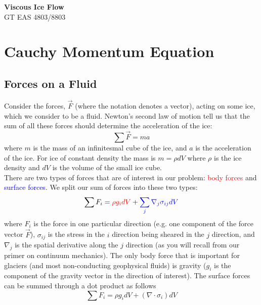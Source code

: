 \documentclass[12pt]{article}
\theoremstyle{definition}
\begin{document}
\thispagestyle{empty}

\begin{center}
{\LARGE \bf Viscous Ice Flow}\\
{\large GT EAS 4803/8803}\\
\end{center}
\section{Cauchy Momentum Equation}

\subsection{Forces on a Fluid}

Consider the forces, $\vec{F}$ (where the notation denotes a vector), acting on some ice, which we consider to be a fluid. Newton's second law of motion tell us that the sum of all these forces should determine the acceleration of the ice:
\begin{equation}
\sum \vec{F} = ma
\end{equation}
where $m$ is the mass of an infinitesmal cube of the ice, and $a$ is the acceleration of the ice. For ice of constant density the mass is $m=\rho dV$ where $\rho$ is the ice density and $dV$ is the volume of the small ice cube. \\

There are two types of forces that are of interest in our problem: \textcolor{red}{body forces} and \textcolor{blue}{surface forces}. We split our sum of forces into these two types:
\begin{equation}
\sum F_i = \textcolor{red}{\rho g_i dV} + \textcolor{blue}{\sum_j \nabla_j \sigma_{ij} dV}
\end{equation}
where $F_i$ is the force in one particular direction (e.g. one component of the force vector $\vec{F}$), $\sigma_{ij}$ is the stress in the $i$ direction being sheared in the $j$ direction, and $\nabla_j$ is the spatial derivative along the $j$ direction (as you will recall from our primer on continuum mechanics). The only body force that is important for glaciers (and most non-conducting geophysical fluids) is gravity ($g_i$ is the component of the gravity vector in the direction of interest). The surface forces can be summed through a dot product as follows
\begin{equation}
\sum F_i = \rho g_i dV + \left(\nabla \cdot \sigma_i \right) dV
\end{equation}
\end{document}
